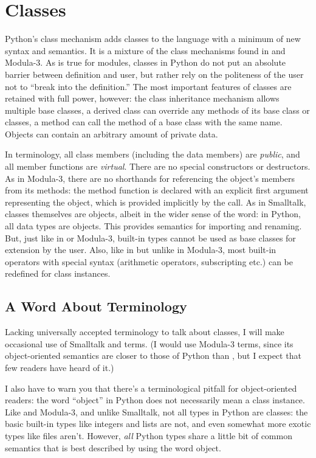 \documentclass{manual}
\begin{document}
\chapter{Classes \label{classes}}

Python's class mechanism adds classes to the language with a minimum
of new syntax and semantics.  It is a mixture of the class mechanisms
found in \Cpp{} and Modula-3.  As is true for modules, classes in Python
do not put an absolute barrier between definition and user, but rather
rely on the politeness of the user not to ``break into the
definition.''  The most important features of classes are retained
with full power, however: the class inheritance mechanism allows
multiple base classes, a derived class can override any methods of its
base class or classes, a method can call the method of a base class with the
same name.  Objects can contain an arbitrary amount of private data.

In \Cpp{} terminology, all class members (including the data members) are
\emph{public}, and all member functions are \emph{virtual}.  There are
no special constructors or destructors.  As in Modula-3, there are no
shorthands for referencing the object's members from its methods: the
method function is declared with an explicit first argument
representing the object, which is provided implicitly by the call.  As
in Smalltalk, classes themselves are objects, albeit in the wider
sense of the word: in Python, all data types are objects.  This
provides semantics for importing and renaming.  But, just like in
\Cpp{} or Modula-3, built-in types cannot be used as base classes for
extension by the user.  Also, like in \Cpp{} but unlike in Modula-3, most
built-in operators with special syntax (arithmetic operators,
subscripting etc.) can be redefined for class instances.

\section{A Word About Terminology \label{terminology}}

Lacking universally accepted terminology to talk about classes, I will
make occasional use of Smalltalk and \Cpp{} terms.  (I would use Modula-3
terms, since its object-oriented semantics are closer to those of
Python than \Cpp{}, but I expect that few readers have heard of it.)

I also have to warn you that there's a terminological pitfall for
object-oriented readers: the word ``object'' in Python does not
necessarily mean a class instance.  Like \Cpp{} and Modula-3, and
unlike Smalltalk, not all types in Python are classes: the basic
built-in types like integers and lists are not, and even somewhat more
exotic types like files aren't.  However, \emph{all} Python types
share a little bit of common semantics that is best described by using
the word object.
\end{document}
